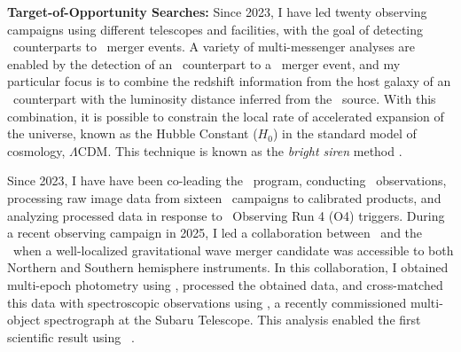 \textbf{Target-of-Opportunity Searches:}
Since 2023, I have led twenty observing campaigns using different telescopes and facilities, with the goal of detecting \EM\ counterparts to \GW\ merger events. 
A variety of multi-messenger analyses are enabled by the detection of an \EM\ counterpart to a \GW\ merger event, and my particular focus is to combine the redshift information from the host galaxy of an \EM\ 
counterpart with the luminosity distance inferred from the \GW\ source. With this combination, it is possible to constrain the local rate of accelerated expansion of the universe, known as the Hubble Constant ($H_0$) in the standard model of cosmology, $\Lambda$CDM. This technique is known as the \textit{bright siren} method \cite{2017Natur.551...85A}.

Since 2023, I have have been co-leading the \DESGW\ program, conducting \DECam\ observations, processing raw image data from sixteen \ToO\ campaigns to calibrated products, and analyzing processed data in response to \LVK\ Observing Run 4 (O4) triggers.
During a recent observing campaign in 2025, I led a collaboration between \DESGW\ and the \JGEM\ when a well-localized gravitational wave merger candidate was accessible to both Northern and Southern hemisphere instruments. In this collaboration, I obtained multi-epoch photometry using \DECam, processed the obtained data, and cross-matched this data with spectroscopic observations using \PFS, a recently commissioned multi-object spectrograph at the Subaru Telescope. This analysis enabled the first scientific result using \PFS\ \citep{Zhang2025S250328ae}.





